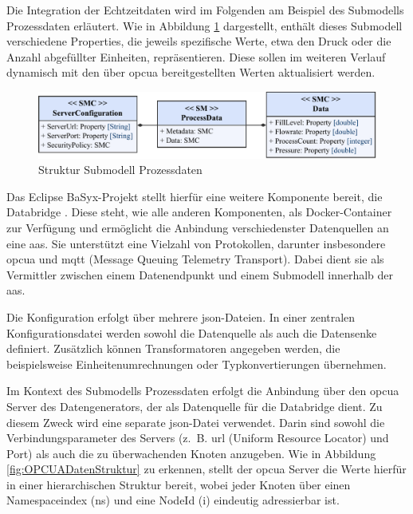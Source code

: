 Die Integration der Echtzeitdaten wird im Folgenden am Beispiel des \mbox{Submodells} Prozessdaten erläutert.
Wie in Abbildung \ref{fig:SubmodellProzessdaten} dargestellt, enthält dieses Submodell verschiedene Properties, die jeweils spezifische Werte, etwa den Druck oder die Anzahl abgefüllter Einheiten, repräsentieren.
Diese sollen im weiteren Verlauf dynamisch mit den über \acs{opcua} bereitgestellten Werten aktualisiert werden.

\begin{figure}[htbp]
    \centering
    \includegraphics[width=1\textwidth]{Bilder/OPCUA/ProcessData.pdf}
    \caption[Struktur Submodell Prozessdaten]{Struktur Submodell Prozessdaten}
    \label{fig:SubmodellProzessdaten}
\end{figure}
\vspace{-0.5em}

Das Eclipse BaSyx-Projekt stellt hierfür eine weitere Komponente bereit, die Databridge \cite{BaSyxDatabridge}.
Diese steht, wie alle anderen Komponenten, als Docker-Container zur Verfügung und ermöglicht die Anbindung verschiedenster Datenquellen an eine \acs{aas}.
Sie unterstützt eine Vielzahl von Protokollen, darunter insbesondere \acs{opcua} und \acs{mqtt} (Message Queuing Telemetry Transport).
Dabei dient sie als Vermittler zwischen einem Datenendpunkt und einem Submodell innerhalb der \acs{aas}.

Die Konfiguration erfolgt über mehrere \acs{json}-Dateien.
In einer zentralen Konfigurationsdatei werden sowohl die Datenquelle als auch die Datensenke definiert.
Zusätzlich können Transformatoren angegeben werden, die beispielsweise Einheitenumrechnungen oder Typkonvertierungen übernehmen.

Im Kontext des Submodells Prozessdaten erfolgt die Anbindung über den \acs{opcua} Server des Datengenerators, der als Datenquelle für die Databridge dient.
Zu diesem Zweck wird eine separate \acs{json}-Datei verwendet.
Darin sind sowohl die Verbindungsparameter des Servers (z.~B. \acs{url} (Uniform Resource Locator) und Port) als auch die zu überwachenden Knoten anzugeben.
Wie in Abbildung \ref{fig:OPCUADatenStruktur} zu erkennen, stellt der \acs{opcua} Server die Werte hierfür in einer hierarchischen Struktur bereit, wobei jeder Knoten über einen Namespaceindex (ns) und eine NodeId (i) eindeutig adressierbar ist.

